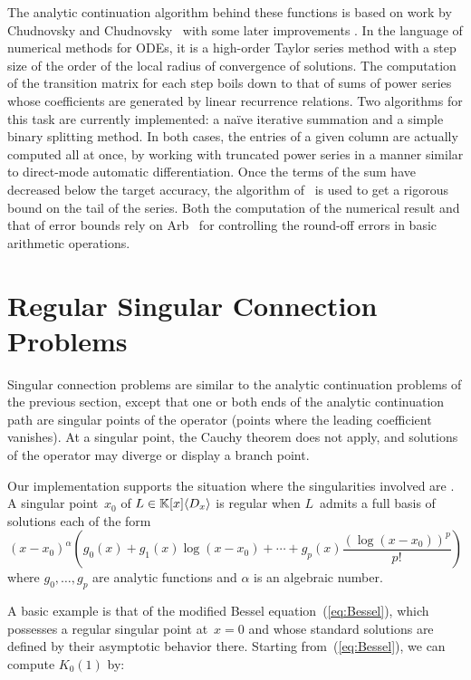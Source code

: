 \documentclass[runningheads,a4paper]{llncs}
\begin{document}
The analytic continuation algorithm behind these functions is based
on work by Chudnovsky and Chudnovsky~\cite{ChudnovskyChudnovsky1990}
with some later improvements \cite{vdH1999,Mezzarobba2011}. In the
language of numerical methods for ODEs, it is a high-order Taylor series
method with a step size of the order of the local radius of convergence of
solutions. The computation of the transition matrix for each step boils down
to that of sums of power series whose coefficients are generated by linear
recurrence relations. Two algorithms for this task are currently implemented:
a naïve iterative summation and a simple binary splitting method. In both
cases, the entries of a given column are actually computed all at once, by
working with truncated power series in a manner similar to direct-mode
automatic differentiation. Once the terms of the sum have decreased below the
target accuracy, the algorithm of~{\cite{Mezzarobba-numbounds}} is used to get
a rigorous bound on the tail of the series. Both the computation of the
numerical result and that of error bounds rely on Arb~{\cite{Johansson2013}}
for controlling the round-off errors in basic arithmetic operations.

\section{Regular Singular Connection Problems}

Singular connection problems are similar to the analytic continuation problems
of the previous section, except that one or both ends of the analytic
continuation path are singular points of the operator (points where the
leading coefficient vanishes). At a singular point, the Cauchy theorem does
not apply, and solutions of the operator may diverge or display a branch
point.

Our implementation supports the situation where the singularities involved are
{}. A singular point~$x_0$ of $L \in \mathbbm{K}
[x] \langle D_x \rangle$ is regular when $L$~admits a full basis of solutions
each of the form
\begin{equation}
  (x - x_0)^{\alpha}  \left( g_0 (x) + g_1 (x) \log (x - x_0) + \cdots + g_p
  (x)  \frac{(\log (x - x_0))^p}{p!} \right) \label{eq:regsingexp}
\end{equation}
where $g_0, \ldots, g_p$ are analytic functions and $\alpha$ is an algebraic number.

A basic example is that of the modified Bessel equation~(\ref{eq:Bessel}),
which possesses a regular singular point at~$x = 0$ and whose standard solutions
are defined by their asymptotic behavior there. Starting
from~(\ref{eq:Bessel}), we can compute $K_0 (1)$ by:
\end{document}
